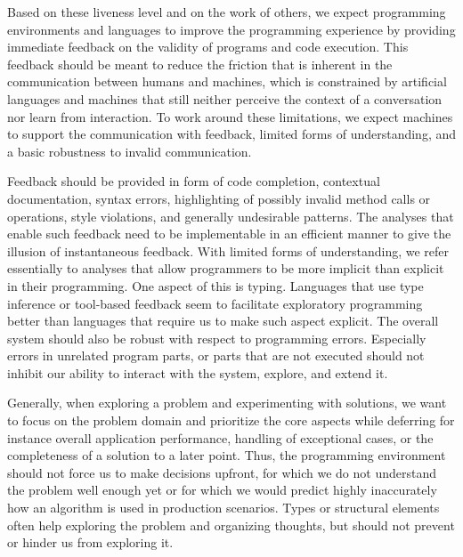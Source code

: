 \documentclass[sigconf, 10pt]{acmart}
\begin{document}
Based on these liveness level and on the work of others\citep{McDirmid:2007:LUL,Burckhardt:2013:ACF,Rein:2016:LLP},
we expect programming environments and languages
to improve the programming experience by providing immediate feedback on
the validity of programs and code execution.
This feedback should be meant to reduce the friction
that is inherent in the communication between humans and machines,
which is constrained by artificial languages and machines
that still neither perceive the context of a conversation nor learn from interaction.
To work around these limitations,
we expect machines to support the communication with feedback,
limited forms of understanding,
and a basic robustness to invalid communication.

Feedback should be provided in form of
code completion, contextual documentation,
syntax errors, highlighting of possibly invalid method calls or operations,
style violations, and generally undesirable patterns.
The analyses that enable such feedback need to be implementable
in an efficient manner to give the illusion of instantaneous feedback.
%
With limited forms of understanding,
we refer essentially to analyses
that allow programmers to be more implicit than explicit in their programming.
One aspect of this is typing.
Languages that use type inference
or tool-based feedback seem to facilitate exploratory programming better
than languages that require us to make such aspect explicit.
%   
The overall system should also be robust with respect to programming errors.
Especially errors in unrelated program parts,
or parts that are not executed
should not inhibit our ability to interact with the system,
explore, and extend it.

Generally, when exploring a problem and experimenting with solutions,
we want to focus on the problem domain and prioritize the core aspects
while deferring for instance overall application performance,
handling of exceptional cases,
or the completeness of a solution to a later point.
Thus, the programming environment should not force us to make decisions upfront,
for which we do not understand the problem well enough yet
or for which we would predict highly inaccurately
how an algorithm is used in production scenarios.
Types or structural elements often help exploring
the problem and organizing thoughts,
but should not prevent or hinder us from exploring it.
\end{document}
